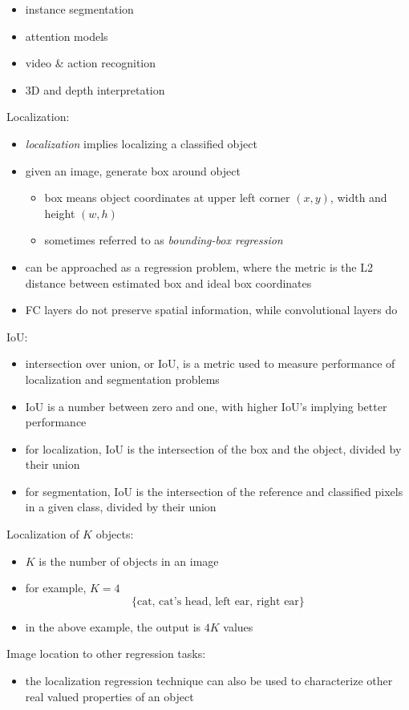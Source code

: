\documentclass[onecolumn]{IEEEtran}
\newcommand{\beq}{\begin{equation}}
\newcommand{\eeq}{\end{equation}}
\newcommand{\bi}{\begin{itemize}}
\newcommand{\ei}{\end{itemize}}
\begin{document}
\begin{itemize}
        \item instance segmentation
        \item attention models
        \item video \& action recognition
        \item 3D and depth interpretation
    \ei
    \item Localization:
    \bi
        \item \emph{localization} implies localizing a classified object
        \item given an image, generate box around object
        \bi
            \item box means object coordinates at upper left corner $(x,y)$, width and height $(w,h)$
            \item sometimes referred to as \emph{bounding-box regression}
        \ei
        \item can be approached as a regression problem, where the metric is the L2 distance between estimated box and ideal box coordinates
        \item FC layers do not preserve spatial information, while convolutional layers do
    \ei
    \item IoU:
    \bi
        \item intersection over union, or IoU, is a metric used to measure performance of localization and segmentation problems
        \item IoU is a number between zero and one, with higher IoU's implying better performance
        \item for localization, IoU is the intersection of the box and the object, divided by their union
        \item for segmentation, IoU is the intersection of the reference and classified pixels in a given class, divided by their union
    \ei
    \item Localization of $K$ objects:
    \bi
        \item $K$ is the number of objects in an image
        \item for example, $K=4$
        \beq
            \{ \text{cat,  cat's head,  left ear,  right ear} \}
        \eeq
        \item in the above example, the output is $4K$ values
    \ei
    \item Image location to other regression tasks:
    \bi
        \item the localization regression technique can also be used to characterize other real valued properties of an object

\end{itemize}
\end{document}
